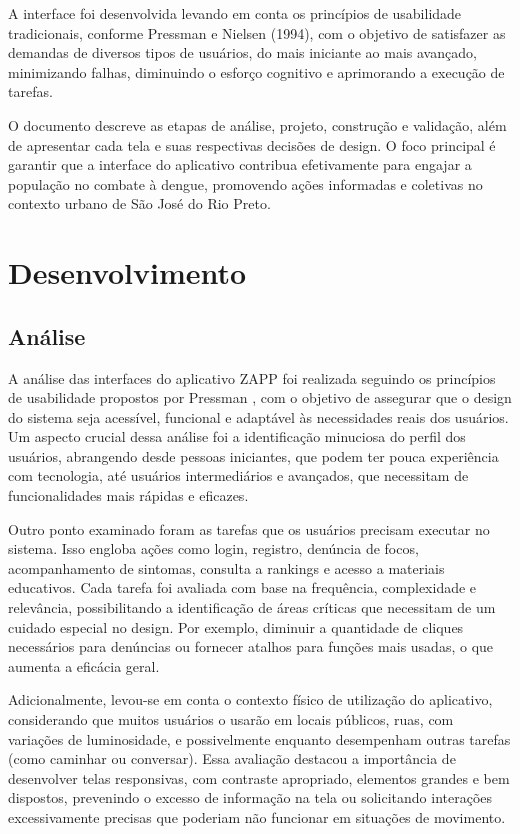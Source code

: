 \documentclass[a4paper, 12pt]{article}
\begin{document}
A interface foi desenvolvida levando em conta os princípios de usabilidade tradicionais, conforme Pressman \cite{pressman-2019} e Nielsen (1994), com o objetivo de satisfazer as demandas de diversos tipos de usuários, do mais iniciante ao mais avançado, minimizando falhas, diminuindo o esforço cognitivo e aprimorando a execução de tarefas. 
 
O documento descreve as etapas de análise, projeto, construção e validação, além de apresentar cada tela e suas respectivas decisões de design. O foco principal é garantir que a interface do aplicativo contribua efetivamente para engajar a população no combate à dengue, promovendo ações informadas e coletivas no contexto urbano de São José do Rio Preto.

\newpage
\section{Desenvolvimento}

\subsection{Análise}
A análise das interfaces do aplicativo ZAPP foi realizada seguindo os princípios de usabilidade propostos por Pressman \cite{pressman-2019}, com o objetivo de assegurar que o design do sistema seja acessível, funcional e adaptável às necessidades reais dos usuários. Um aspecto crucial dessa análise foi a identificação minuciosa do perfil dos usuários, abrangendo desde pessoas iniciantes, que podem ter pouca experiência com tecnologia, até usuários intermediários e avançados, que necessitam de funcionalidades mais rápidas e eficazes.

Outro ponto examinado foram as tarefas que os usuários precisam executar no sistema. Isso engloba ações como login, registro, denúncia de focos, acompanhamento de sintomas, consulta a rankings e acesso a materiais educativos. Cada tarefa foi avaliada com base na frequência, complexidade e relevância, possibilitando a identificação de áreas críticas que necessitam de um cuidado especial no design. Por exemplo, diminuir a quantidade de cliques necessários para denúncias ou fornecer atalhos para funções mais usadas, o que aumenta a eficácia geral.

Adicionalmente, levou-se em conta o contexto físico de utilização do aplicativo, considerando que muitos usuários o usarão em locais públicos, ruas, com variações de luminosidade, e possivelmente enquanto desempenham outras tarefas (como caminhar ou conversar). Essa avaliação destacou a importância de desenvolver telas responsivas, com contraste apropriado, elementos grandes e bem dispostos, prevenindo o excesso de informação na tela ou solicitando interações excessivamente precisas que poderiam não funcionar em situações de movimento.
\end{document}
